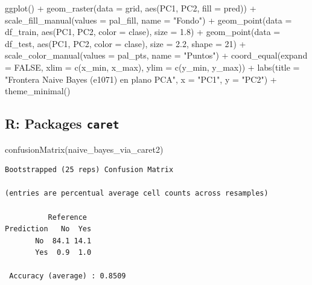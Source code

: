 \documentclass[
  letterpaper,
  DIV=11,
  numbers=noendperiod]{scrartcl}
\newenvironment{Shaded}{\begin{snugshade}}{\end{snugshade}}
\newcommand{\AttributeTok}[1]{\textcolor[rgb]{0.40,0.45,0.13}{#1}}
\newcommand{\ConstantTok}[1]{\textcolor[rgb]{0.56,0.35,0.01}{#1}}
\newcommand{\DecValTok}[1]{\textcolor[rgb]{0.68,0.00,0.00}{#1}}
\newcommand{\FloatTok}[1]{\textcolor[rgb]{0.68,0.00,0.00}{#1}}
\newcommand{\FunctionTok}[1]{\textcolor[rgb]{0.28,0.35,0.67}{#1}}
\newcommand{\NormalTok}[1]{\textcolor[rgb]{0.00,0.23,0.31}{#1}}
\newcommand{\SpecialCharTok}[1]{\textcolor[rgb]{0.37,0.37,0.37}{#1}}
\newcommand{\StringTok}[1]{\textcolor[rgb]{0.13,0.47,0.30}{#1}}
\begin{document}
\begin{Shaded}
\begin{Highlighting}[]
\FunctionTok{ggplot}\NormalTok{() }\SpecialCharTok{+}
  \FunctionTok{geom\_raster}\NormalTok{(}\AttributeTok{data =}\NormalTok{ grid, }\FunctionTok{aes}\NormalTok{(PC1, PC2, }\AttributeTok{fill =}\NormalTok{ pred)) }\SpecialCharTok{+}
  \FunctionTok{scale\_fill\_manual}\NormalTok{(}\AttributeTok{values =}\NormalTok{ pal\_fill, }\AttributeTok{name =} \StringTok{"Fondo"}\NormalTok{) }\SpecialCharTok{+}
  \FunctionTok{geom\_point}\NormalTok{(}\AttributeTok{data =}\NormalTok{ df\_train, }\FunctionTok{aes}\NormalTok{(PC1, PC2, }\AttributeTok{color =}\NormalTok{ clase), }\AttributeTok{size =} \FloatTok{1.8}\NormalTok{) }\SpecialCharTok{+}
  \FunctionTok{geom\_point}\NormalTok{(}\AttributeTok{data =}\NormalTok{ df\_test,  }\FunctionTok{aes}\NormalTok{(PC1, PC2, }\AttributeTok{color =}\NormalTok{ clase), }\AttributeTok{size =} \FloatTok{2.2}\NormalTok{, }\AttributeTok{shape =} \DecValTok{21}\NormalTok{) }\SpecialCharTok{+}
  \FunctionTok{scale\_color\_manual}\NormalTok{(}\AttributeTok{values =}\NormalTok{ pal\_pts, }\AttributeTok{name =} \StringTok{"Puntos"}\NormalTok{) }\SpecialCharTok{+}
  \FunctionTok{coord\_equal}\NormalTok{(}\AttributeTok{expand =} \ConstantTok{FALSE}\NormalTok{, }\AttributeTok{xlim =} \FunctionTok{c}\NormalTok{(x\_min, x\_max), }\AttributeTok{ylim =} \FunctionTok{c}\NormalTok{(y\_min, y\_max)) }\SpecialCharTok{+}
  \FunctionTok{labs}\NormalTok{(}\AttributeTok{title =} \StringTok{"Frontera Naive Bayes (e1071) en plano PCA"}\NormalTok{, }\AttributeTok{x =} \StringTok{"PC1"}\NormalTok{, }\AttributeTok{y =} \StringTok{"PC2"}\NormalTok{) }\SpecialCharTok{+}
  \FunctionTok{theme\_minimal}\NormalTok{()}
\end{Highlighting}
\end{Shaded}

\subsection{\texorpdfstring{R: Packages
\texttt{caret}}{R: Packages caret}}

\begin{Shaded}
\begin{Highlighting}[]
\FunctionTok{confusionMatrix}\NormalTok{(naive\_bayes\_via\_caret2)}
\end{Highlighting}
\end{Shaded}

\begin{verbatim}
Bootstrapped (25 reps) Confusion Matrix 

(entries are percentual average cell counts across resamples)
 
          Reference
Prediction   No  Yes
       No  84.1 14.1
       Yes  0.9  1.0
                            
 Accuracy (average) : 0.8509
\end{verbatim}
\end{document}
